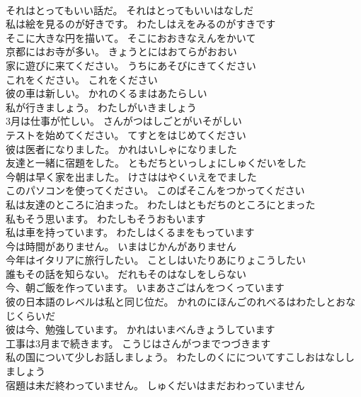 \documentclass[8pt]{extreport}
\begin{document}
\begin{CJK}{UTF8}{min}
\\	それはとってもいい話だ。	それはとってもいいはなしだ 
\\	私は絵を見るのが好きです。	わたしはえをみるのがすきです 
\\	そこに大きな円を描いて。	そこにおおきなえんをかいて 
\\	京都にはお寺が多い。	きょうとにはおてらがおおい 
\\	家に遊びに来てください。	うちにあそびにきてください 
\\	これをください。	これをください 
\\	彼の車は新しい。	かれのくるまはあたらしい 
\\	私が行きましょう。	わたしがいきましょう 
\\	3月は仕事が忙しい。	さんがつはしごとがいそがしい 
\\	テストを始めてください。	てすとをはじめてください 
\\	彼は医者になりました。	かれはいしゃになりました 
\\	友達と一緒に宿題をした。	ともだちといっしょにしゅくだいをした 
\\	今朝は早く家を出ました。	けさははやくいえをでました 
\\	このパソコンを使ってください。	このぱそこんをつかってください 
\\	私は友達のところに泊まった。	わたしはともだちのところにとまった 
\\	私もそう思います。	わたしもそうおもいます 
\\	私は車を持っています。	わたしはくるまをもっています 
\\	今は時間がありません。	いまはじかんがありません 
\\	今年はイタリアに旅行したい。	ことしはいたりあにりょこうしたい 
\\	誰もその話を知らない。	だれもそのはなしをしらない 
\\	今、朝ご飯を作っています。	いまあさごはんをつくっています 
\\	彼の日本語のレベルは私と同じ位だ。	かれのにほんごのれべるはわたしとおなじくらいだ 
\\	彼は今、勉強しています。	かれはいまべんきょうしています 
\\	工事は3月まで続きます。	こうじはさんがつまでつづきます 
\\	私の国について少しお話しましょう。	わたしのくにについてすこしおはなししましょう 
\\	宿題は未だ終わっていません。	しゅくだいはまだおわっていません 

\end{CJK}
\end{document}
